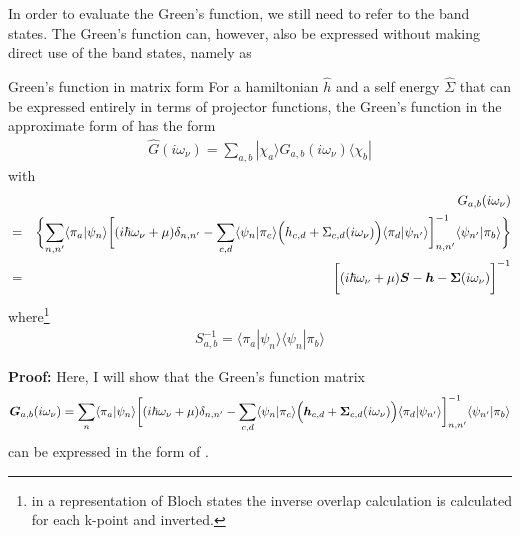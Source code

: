 \documentclass[11pt,a4paper]{report}
\begin{document}
In order to evaluate the Green's function, we still need to refer to the
band states. The Green's function can, however, also be expressed
without making direct use of the band states, namely as
\begin{myshadowminipage}{Green's function in matrix form}
For a hamiltonian $\hat{h}$ and a self energy $\hat{\Sigma}$ that can
be expressed entirely in terms of projector functions, the Green's
function in the approximate form of  has the form
\begin{eqnarray}
\hat{G}(i\omega_\nu)=\sum_{a,b}|\chi_a\rangle
G_{a,b}(i\omega_\nu)\langle\chi_b|
\end{eqnarray}
with
\begin{eqnarray}
&&G_{a,b}(i\omega_\nu)
\nonumber\\
&=&
\biggl\lbrace
\sum_{n,n'}\langle\pi_a|\psi_n\rangle
\biggl[
(i\hbar\omega_\nu+\mu)\delta_{n,n'}
-\sum_{c,d}\langle\psi_n|\pi_c\rangle
\Bigl(h_{c,d}+\Sigma_{c,d}(i\omega_\nu)\Bigr)
\langle\pi_d|\psi_{n'}\rangle
\biggr]^{-1}_{n,n'}
\langle\psi_{n'}|\pi_b\rangle
\biggr\rbrace
\nonumber\\
&=&\biggl[(i\hbar\omega_\nu+\mu)\bm{S}
-\bm{h}-\bm{\Sigma}(i\omega_\nu)\biggr]^{-1}
\label{eq:greenlocform1}
\end{eqnarray}
where\footnote{in a representation of Bloch states the inverse overlap
  calculation is calculated for each k-point and inverted.}
\begin{eqnarray}
S^{-1}_{a,b}=\langle\pi_a|\psi_n\rangle \langle\psi_n|\pi_b\rangle
\label{eq:inverses}
\end{eqnarray}
\end{myshadowminipage}





\textbf{Proof:}
Here, I will show that the Green's function matrix 
\begin{eqnarray}
\bm{G}_{a,b}(i\omega_\nu)=
\sum_n\langle\pi_a|\psi_n\rangle
\biggl[
(i\hbar\omega_\nu+\mu)\delta_{n,n'}-
\sum_{c,d}\langle\psi_n|\pi_c\rangle
\Bigl(\bm{h}_{c,d}+\bm{\Sigma}_{c,d}(i\omega_\nu)\Bigr)
\langle\pi_d|\psi_{n'}\rangle
\biggr]^{-1}_{n,n'}
\langle\psi_{n'}|\pi_b\rangle
\nonumber\\
\label{eq:greenlocform2}
\end{eqnarray}
can be expressed in the form of .
\end{document}
